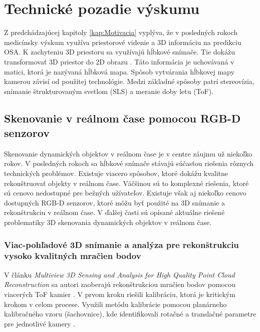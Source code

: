 
\chapter{Technické pozadie výskumu} 
\label{kap:technické_pozadie}
\pagestyle{fancy}
\fancyhf{}
\fancyfoot[CE,CO]{\thepage}
\renewcommand{\footrulewidth}{1pt}

Z predchádzajúcej kapitoly \ref{kap:Motivacia} vyplýva, že v posledných rokoch medicínsky výskum využíva priestorové videnie a 3D informáciu na predikciu OSA. K zachyteniu 3D priestoru sa využívajú hĺbkové snímače. Tie dokážu transformovať 3D priestor do 2D obrazu \cite{Malik_Choi_2008}. Táto informácia je uchovávaná v matici, ktorá je nazývaná hĺbková mapa. Spôsob vytvárania hĺbkovej mapy kamerou závisí od použitej technológie. Medzi základné spôsoby patrí stereovízia, snímanie štrukturovaným svetlom (SLS) a meranie doby letu (ToF). 

\section{Skenovanie v reálnom čase pomocou \mbox{RGB-D} senzorov}

Skenovanie dynamických objektov v reálnom čase je v centre záujmu už niekoľko rokov. V posledných rokoch sa hĺbkové snímače stávajú súčasťou riešenia rôznych technických problémov. Existuje viacero spôsobov, ktoré dokážu kvalitne rekonštruovať objekty v reálnom čase. Väčšinou sú to komplexné riešenia, ktoré sú cenovo nedostupné pre bežných užívateľov. Existuje však aj niekoľko cenovo dostupných RGB-D senzorov, ktoré môžu byť použité na 3D snímanie a rekonštrukciu v reálnom čase. V ďalšej časti sú opísané aktuálne riešené problematiky 3D skenovania dynamických objektov v reálnom čase. 

\newpage
\subsection{Viac-pohľadové 3D snímanie a analýza pre rekonštrukciu vysoko kvalitných mračien bodov}

V článku \textit{Multiview 3D Sensing and Analysis for High Quality Point Cloud Reconstruction} sa autori zaoberajú rekonštrukciou mračien bodov pomocou viacerých ToF kamier \cite{satnik2018multiview}. 
V prvom kroku riešili kalibráciu, ktorá je kritickým krokom v celom procese. Využili metódu kalibrácie pomocou planárneho kalibračného vzoru (šachovnice), kde identifikovali rotačné a translačné parametre pre jednotlivé kamery \cite{zhang2000flexible}. 

